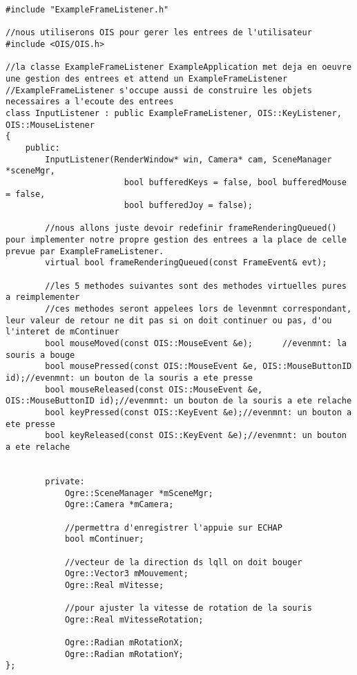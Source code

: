 \begin{lstlisting}[caption={InputListener.h}]
#include "ExampleFrameListener.h"

//nous utiliserons OIS pour gerer les entrees de l'utilisateur
#include <OIS/OIS.h>

//la classe ExampleFrameListener ExampleApplication met deja en oeuvre une gestion des entrees et attend un ExampleFrameListener
//ExampleFrameListener s'occupe aussi de construire les objets necessaires a l'ecoute des entrees
class InputListener : public ExampleFrameListener, OIS::KeyListener, OIS::MouseListener
{
    public:
        InputListener(RenderWindow* win, Camera* cam, SceneManager *sceneMgr, 
                        bool bufferedKeys = false, bool bufferedMouse = false, 
                        bool bufferedJoy = false);
        
        //nous allons juste devoir redefinir frameRenderingQueued() pour implementer notre propre gestion des entrees a la place de celle prevue par ExampleFrameListener.
        virtual bool frameRenderingQueued(const FrameEvent& evt);
        
        //les 5 methodes suivantes sont des methodes virtuelles pures a reimplementer
        //ces methodes seront appelees lors de levenmnt correspondant, leur valeur de retour ne dit pas si on doit continuer ou pas, d'ou l'interet de mContinuer
        bool mouseMoved(const OIS::MouseEvent &e);      //evenmnt: la souris a bouge
        bool mousePressed(const OIS::MouseEvent &e, OIS::MouseButtonID id);//evenmnt: un bouton de la souris a ete presse
        bool mouseReleased(const OIS::MouseEvent &e, OIS::MouseButtonID id);//evenmnt: un bouton de la souris a ete relache 
        bool keyPressed(const OIS::KeyEvent &e);//evenmnt: un bouton a ete presse 
        bool keyReleased(const OIS::KeyEvent &e);//evenmnt: un bouton a ete relache 
        

        private:
            Ogre::SceneManager *mSceneMgr;
            Ogre::Camera *mCamera;
            
            //permettra d'enregistrer l'appuie sur ECHAP
            bool mContinuer;

            //vecteur de la direction ds lqll on doit bouger
            Ogre::Vector3 mMouvement;
            Ogre::Real mVitesse;
            
            //pour ajuster la vitesse de rotation de la souris
            Ogre::Real mVitesseRotation;

            Ogre::Radian mRotationX;
            Ogre::Radian mRotationY;
};

\end{lstlisting}













